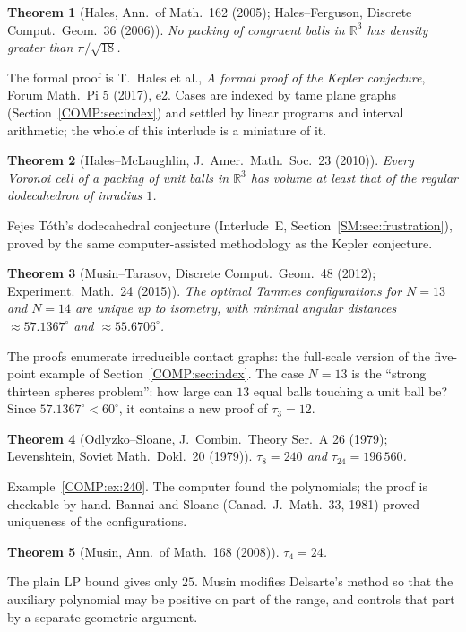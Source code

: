 \documentclass[11pt,openany]{book}
\theoremstyle{plain}
\newtheorem{theorem}{Theorem}[chapter]
\theoremstyle{definition}
\theoremstyle{remark}
\newcommand{\R}{\mathbb{R}}
\newcommand{\kiss}{\tau}               %
\begin{document}
\begin{theorem}[Hales, Ann.\ of Math.\ 162 (2005); Hales--Ferguson, Discrete Comput.\ Geom.\ 36 (2006)]
No packing of congruent balls in $\R^3$ has density greater than $\pi/\sqrt{18}$.
\end{theorem}
\noindent The formal proof is T.~Hales et al., \emph{A formal proof of the Kepler conjecture}, Forum Math.\ Pi 5
(2017), e2. Cases are indexed by tame plane graphs (Section~\ref{COMP:sec:index}) and settled by linear programs
and interval arithmetic; the whole of this interlude is a miniature of it.

\begin{theorem}[Hales--McLaughlin, J.\ Amer.\ Math.\ Soc.\ 23 (2010)]
Every Voronoi cell of a packing of unit balls in $\R^3$ has volume at least that of the regular dodecahedron
of inradius $1$.
\end{theorem}
\noindent Fejes T\'oth's dodecahedral conjecture (Interlude~E, Section~\ref{SM:sec:frustration}), proved by the
same computer-assisted methodology as the Kepler conjecture.

\begin{theorem}[Musin--Tarasov, Discrete Comput.\ Geom.\ 48 (2012); Experiment.\ Math.\ 24 (2015)]
The optimal Tammes configurations for $N=13$ and $N=14$ are unique up to isometry, with minimal angular
distances $\approx57.1367^\circ$ and $\approx55.6706^\circ$.
\end{theorem}
\noindent The proofs enumerate irreducible contact graphs: the full-scale version of the five-point example of
Section~\ref{COMP:sec:index}. The case $N=13$ is the ``strong thirteen spheres problem'': how large can $13$ equal balls touching a unit ball
be? Since $57.1367^\circ<60^\circ$, it contains a new proof of $\kiss_3=12$.

\begin{theorem}[Odlyzko--Sloane, J.\ Combin.\ Theory Ser.~A 26 (1979); Levenshtein, Soviet Math.\ Dokl.\ 20 (1979)]
$\kiss_8=240$ and $\kiss_{24}=196\,560$.
\end{theorem}
\noindent Example~\ref{COMP:ex:240}. The computer found the polynomials; the proof is checkable by hand.
Bannai and Sloane (Canad.\ J.\ Math.\ 33, 1981) proved uniqueness of the configurations.

\begin{theorem}[Musin, Ann.\ of Math.\ 168 (2008)]
$\kiss_4=24$.
\end{theorem}
\noindent The plain LP bound gives only $25$. Musin modifies Delsarte's method so that the auxiliary polynomial
may be positive on part of the range, and controls that part by a separate geometric argument.
\end{document}
